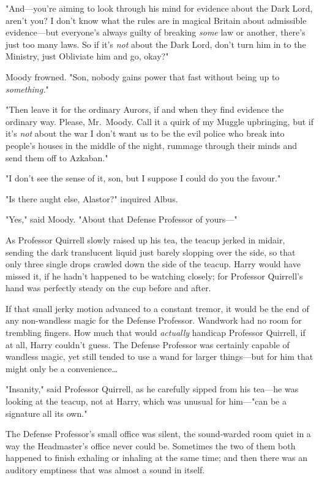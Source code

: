 "And---you're aiming to look through his mind for evidence about the Dark Lord,
aren't you? I don't know what the rules are in magical Britain about admissible
evidence---but everyone's always guilty of breaking \emph{some} law or another,
there's just too many laws. So if it's \emph{not} about the Dark Lord, don't
turn him in to the Ministry, just Obliviate him and go, okay?"

Moody frowned. "Son, nobody gains power that fast without being up to
\emph{something.}"

"Then leave it for the ordinary Aurors, if and when they find evidence the
ordinary way. Please, Mr.~Moody. Call it a quirk of my Muggle upbringing, but
if it's \emph{not} about the war I don't want us to be the evil police who
break into people's houses in the middle of the night, rummage through their
minds and send them off to Azkaban."

"I don't see the sense of it, son, but I suppose I could do you the favour."

"Is there aught else, Alastor?" inquired Albus.

"Yes," said Moody. "About that Defense Professor of yours---"

As Professor Quirrell slowly raised up his tea, the teacup jerked in midair,
sending the dark translucent liquid just barely slopping over the side, so that
only three single drops crawled down the side of the teacup. Harry would have
missed it, if he hadn't happened to be watching closely; for Professor
Quirrell's hand was perfectly steady on the cup before and after.

If that small jerky motion advanced to a constant tremor, it would be the end
of any non-wandless magic for the Defense Professor. Wandwork had no room for
trembling fingers. How much that would \emph{actually} handicap Professor
Quirrell, if at all, Harry couldn't guess. The Defense Professor was certainly
capable of wandless magic, yet still tended to use a wand for larger
things---but for him that might only be a convenience{\ldots}

"Insanity," said Professor Quirrell, as he carefully sipped from his tea---he
was looking at the teacup, not at Harry, which was unusual for him---"can be a
signature all its own."

The Defense Professor's small office was silent, the sound-warded room quiet in
a way the Headmaster's office never could be. Sometimes the two of them both
happened to finish exhaling or inhaling at the same time; and then there was an
auditory emptiness that was almost a sound in itself.

